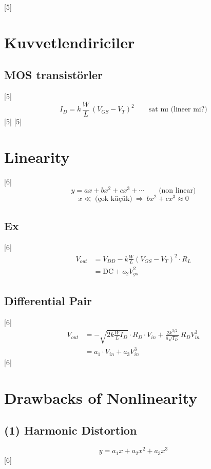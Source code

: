 \documentclass[11pt,a4paper]{article}
\begin{document}
[5]

\section{Kuvvetlendiriciler}
\subsection{MOS transistörler}
[5]
\[ I_D = k\,\frac{W}{L}\,(V_{GS}-V_T)^2 \qquad \text{sat mı (lineer mi?)} \]
[5]
[5]

\section{Linearity}
[6]
\[ y = ax + bx^2 + cx^3 + \cdots \qquad \text{(non linear)} \]
\[ x \ll\ \text{(çok küçük)}\ \Rightarrow\ bx^2+cx^3 \approx 0 \]

\subsection{Ex}
[6]
\begin{align*}
V_{out} &= V_{DD} - k\frac{W}{L}(V_{GS}-V_T)^2\cdot R_L\\
&= \mathrm{DC} + a_2 V_{gs}^2
\end{align*}

\subsection{Differential Pair}
[6]
\begin{align*}
V_{out} &= -\sqrt{2k\frac{W}{L}I_D}\cdot R_D\cdot V_{in} + \frac{2k^{3/2}}{8\sqrt{I_D}}\,R_D V_{in}^3\\
&= a_1\cdot V_{in} + a_3 V_{in}^3
\end{align*}
[6]

\section{Drawbacks of Nonlinearity}
\subsection{(1) Harmonic Distortion}
\[ y = a_1x + a_2x^2 + a_3x^3 \]
[6]
\end{document}
